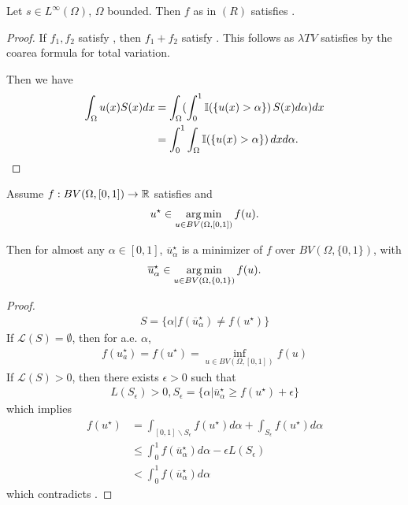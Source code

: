 \begin{proposition}
  Let $s \in L^{\infty}(\Omega)$, $\Omega$ bounded.  Then $f$ as in
  $(R)$ satisfies \gcc.
\end{proposition}

\begin{proof}
  If $f_{1}, f_{2}$ satisfy \gcc, then $f_{1} + f_{2}$ satisfy \gcc.
  This follows as $\lambda TV$ satisfies \gcc by the coarea formula for
  total variation.

  Then we have
  \begin{align}
    \label{eq:119}
    \int_{\Omega} u(x) S(x) dx &= \int_{\Omega} (\int_{0}^{1} \I{\{
      u(x) > \alpha \}} S(x) d\alpha) dx \\
    &= \int_{0}^{1} \int_{\Omega} \I{\{ u(x) > \alpha \}} dx d \alpha.
  \end{align}
\end{proof}

\begin{thm}
  \label{defn:relaxation:4}
  Assume $f: BV(\Omega, [0, 1]) \rightarrow \mathbb{R}$ satisfies \gcc and
  \begin{align}
    \label{eq:130}
      u^{\star} \in \operatorname*{arg\,min}_{u \in BV(\Omega, [0, 1])} f(u).
  \end{align}

  Then for almost any $\alpha \in [0, 1]$, $\overline
  u^{\star}_{\alpha}$ is a minimizer of $f$ over $BV(\Omega, \{ 0, 1
  \})$, with 
  \begin{align}
    \label{eq:129}
    \overline u^{\star}_{\alpha} \in \operatorname*{arg\,min}_{u \in BV(\Omega, \{ 0, 1
      \})} f(u).
  \end{align}
\end{thm}

\begin{proof}
  \begin{align}
    \label{eq:120}
    S = \{ \alpha | f(\overline u^{\star}_{\alpha}) \neq f(u^{\star}) \}
  \end{align}  If $\mathcal{L}(S) = \emptyset$, then for a.e.
  $\alpha$,
  \begin{align}
    \label{eq:121}
    f(u^{\star}_{a}) = f(u^{\star}) = \inf_{u \in BV(\Omega, [0, 1])} f(u)
  \end{align}
  If $\mathcal{L}(S) > 0$, then there exists $\epsilon > 0$ such that
  \begin{align}
    \label{eq:122}
    L(S_{\epsilon}) > 0, S_{\epsilon} = \{ \alpha | \overline
    u_{\alpha}^{\star} \geq f(u^{\star}) + \epsilon \}
  \end{align} which implies
  \begin{align}
    \label{eq:123}
    f(u^{\star}) &= \int_{[0, 1] \backslash S_{\epsilon}} f(u^{\star})
    d\alpha + \int_{S_{\epsilon}} f(u^{\star}) d\alpha  \\
    &\leq \int_{0}^{1} f(\overline u^{\star}_{\alpha}) d\alpha -
    \epsilon L(S_{\epsilon}) \\
    &< \int_{0}^{1} f(\overline u_{\alpha}^{\star}) d \alpha
  \end{align} which contradicts \gcc.
\end{proof}

